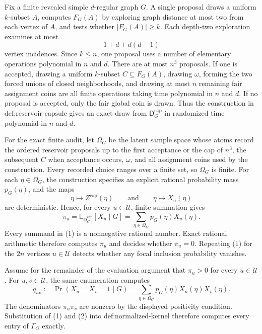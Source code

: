 Fix a finite revealed simple \(d\)-regular graph \(G\). A single proposal draws a uniform \(k\)-subset \(A\), computes \(F_G(A)\) by exploring graph distance at most two from each vertex of \(A\), and tests whether \(\lvert F_G(A)\rvert\ge k\). Each depth-two exploration examines at most
\[
1+d+d(d-1)
\]
vertex incidences. Since \(k\le n\), one proposal uses a number of elementary operations polynomial in \(n\) and \(d\). There are at most \(n^3\) proposals. If one is accepted, drawing a uniform \(k\)-subset \(C\subseteq F_G(A)\), drawing \(\omega\), forming the two forced unions of closed neighborhoods, and drawing at most \(n\) remaining fair assignment coins are all finite operations taking time polynomial in \(n\) and \(d\). If no proposal is accepted, only the fair global coin is drawn. Thus the construction in \(\text{def:reservoir-capsule}\) gives an exact draw from \(\mathsf D_G^{\mathrm{cap}}\) in randomized time polynomial in \(n\) and \(d\).

For the exact finite audit, let \(\Omega_G\) be the latent sample space whose atoms record the ordered reservoir proposals up to the first acceptance or the cap of \(n^3\), the subsequent \(C\) when acceptance occurs, \(\omega\), and all assignment coins used by the construction. Every recorded choice ranges over a finite set, so \(\Omega_G\) is finite. For each \(\eta\in\Omega_G\), the construction specifies an explicit rational probability mass \(p_G(\eta)\), and the maps
\[
\eta\longmapsto Z^{\mathrm{cap}}(\eta)
\qquad\text{and}\qquad
\eta\longmapsto X_u(\eta)
\]
are deterministic. Hence, for every \(u\in\mathcal U\), finite summation gives
\[
\pi_u
=\mathbb E_{\mathsf D_G^{\mathrm{cap}}}[X_u\mid G]
=\sum_{\eta\in\Omega_G}p_G(\eta)X_u(\eta).
\tag{1}
\]
Every summand in (1) is a nonnegative rational number. Exact rational arithmetic therefore computes \(\pi_u\) and decides whether \(\pi_u=0\). Repeating (1) for the \(2n\) vertices \(u\in\mathcal U\) detects whether any focal inclusion probability vanishes.

Assume for the remainder of the evaluation argument that \(\pi_u>0\) for every \(u\in\mathcal U\). For \(u,v\in\mathcal U\), the same enumeration computes
\[
q_{uv}
:=\Pr(X_u=X_v=1\mid G)
=\sum_{\eta\in\Omega_G}p_G(\eta)X_u(\eta)X_v(\eta).
\tag{2}
\]
The denominators \(\pi_u\pi_v\) are nonzero by the displayed positivity condition. Substitution of (1) and (2) into \(\text{def:normalized-kernel}\) therefore computes every entry of \(\Gamma_G\) exactly.

